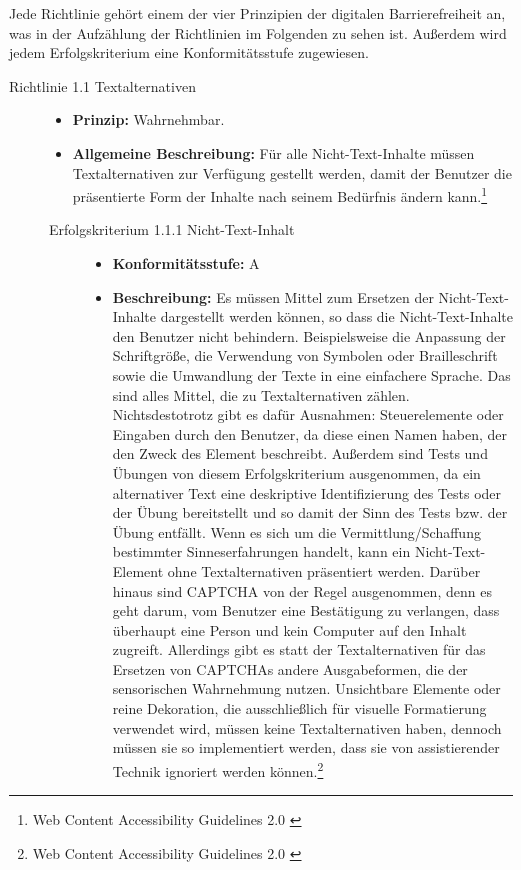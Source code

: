 Jede Richtlinie gehört einem der vier Prinzipien der digitalen Barrierefreiheit an, was in der Aufzählung der Richtlinien im Folgenden zu sehen ist. Außerdem wird jedem Erfolgskriterium  eine Konformitätsstufe zugewiesen.

\begin{description}
	\item[Richtlinie 1.1 Textalternativen]\hfill
	\begin{itemize}
		\item \textbf{Prinzip:} Wahrnehmbar.
		\item \textbf{Allgemeine Beschreibung:} Für alle Nicht-Text-Inhalte müssen Textalternativen zur Verfügung gestellt werden, damit der Benutzer die
		präsentierte Form der Inhalte nach seinem Bedürfnis ändern kann.\footnote{Web Content Accessibility Guidelines 2.0 \cite{WCAG2.0}}
	\end{itemize}
	
	\begin{description}
		\item[Erfolgskriterium 1.1.1 Nicht-Text-Inhalt]\hfill
		\begin{itemize}
			\item \textbf{Konformitätsstufe:} A
			\item \textbf{Beschreibung:} Es müssen Mittel zum Ersetzen der Nicht-Text-Inhalte dargestellt werden können, so dass die
			Nicht-Text-Inhalte den Benutzer nicht behindern. Beispielsweise die Anpassung der Schriftgröße, die Verwendung von Symbolen oder Brailleschrift sowie die Umwandlung der Texte 
			in eine einfachere Sprache. Das sind alles Mittel, die zu Textalternativen zählen.
			Nichtsdestotrotz gibt es dafür Ausnahmen: Steuerelemente oder Eingaben durch den Benutzer, da diese einen Namen haben, der den Zweck des Element
			beschreibt. Außerdem sind Tests und Übungen von diesem Erfolgskriterium ausgenommen, da ein alternativer Text eine deskriptive Identifizierung
			des Tests oder der Übung bereitstellt und so damit der Sinn des Tests bzw. der Übung entfällt. Wenn es sich um die Vermittlung/Schaffung bestimmter
			Sinneserfahrungen handelt, kann ein Nicht-Text-Element ohne Textalternativen präsentiert werden. Darüber hinaus sind \ac{CAPTCHA} von der Regel ausgenommen,
			denn es geht darum, vom Benutzer eine Bestätigung zu verlangen, dass überhaupt eine Person und kein Computer auf den Inhalt zugreift. Allerdings gibt
			es statt der Textalternativen für das Ersetzen von \ac{CAPTCHA}s andere Ausgabeformen, die der sensorischen Wahrnehmung nutzen. Unsichtbare Elemente
			oder reine Dekoration, die ausschließlich für visuelle Formatierung verwendet wird, müssen keine Textalternativen haben, dennoch müssen
			sie so implementiert werden, dass sie von assistierender Technik ignoriert werden können.\footnote{Web Content Accessibility Guidelines 2.0 \cite{WCAG2.0}}
		\end{itemize}
	\end{description}
	

\end{description}
